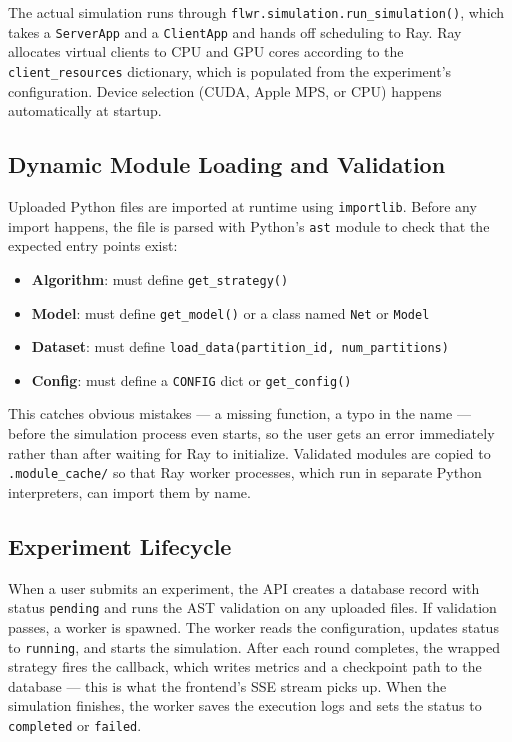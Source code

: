 \documentclass[conference]{IEEEtran}
\begin{document}
The actual simulation runs through \texttt{flwr.simulation.run\_simulation()},
which takes a \texttt{ServerApp} and a \texttt{ClientApp} and hands off
scheduling to Ray.
Ray allocates virtual clients to CPU and GPU cores according to the
\texttt{client\_resources} dictionary, which is populated from the
experiment's configuration.
Device selection (CUDA, Apple MPS, or CPU) happens automatically at
startup.

\subsection{Dynamic Module Loading and Validation}
\label{sec:impl_modules}

Uploaded Python files are imported at runtime using \texttt{importlib}.
Before any import happens, the file is parsed with Python's \texttt{ast}
module to check that the expected entry points exist:
\begin{itemize}
  \item \textbf{Algorithm}: must define \texttt{get\_strategy()}
  \item \textbf{Model}: must define \texttt{get\_model()} or a class
        named \texttt{Net} or \texttt{Model}
  \item \textbf{Dataset}: must define
        \texttt{load\_data(partition\_id, num\_partitions)}
  \item \textbf{Config}: must define a \texttt{CONFIG} dict or
        \texttt{get\_config()}
\end{itemize}
This catches obvious mistakes --- a missing function, a typo in the name
--- before the simulation process even starts, so the user gets an error
immediately rather than after waiting for Ray to initialize.
Validated modules are copied to \texttt{.module\_cache/} so that Ray
worker processes, which run in separate Python interpreters, can import
them by name.

\subsection{Experiment Lifecycle}

When a user submits an experiment, the API creates a database record
with status \texttt{pending} and runs the AST validation on any
uploaded files.
If validation passes, a worker is spawned.
The worker reads the configuration, updates status to \texttt{running},
and starts the simulation.
After each round completes, the wrapped strategy fires the callback,
which writes metrics and a checkpoint path to the database --- this is
what the frontend's SSE stream picks up.
When the simulation finishes, the worker saves the execution logs and
sets the status to \texttt{completed} or \texttt{failed}.
\end{document}
